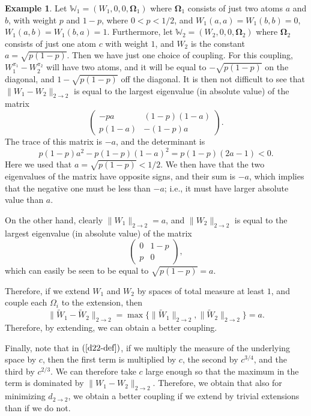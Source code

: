 \documentclass{amsart}
\numberwithin{equation}{section}
\numberwithin{figure}{section}
\theoremstyle{definition}
\newtheorem{example}[theorem]{Example}
\theoremstyle{remark}
\newcommand{\bOmega}{{\mathbf{\Omega}}}
\newcommand{\cW}{\mathbb{W}}
\newcommand{\wW}{\widetilde{W}}
\begin{document}
\begin{example}\label{ex1}
Let $\cW_1=(W_1,0,0,\bOmega_1)$ where $\bOmega_1$ consists of just two atoms
$a$ and $b$, with weight $p$ and $1-p$, where $0<p<1/2$, and
$W_1(a,a)=W_1(b,b)=0$, $W_1(a,b)=W_1(b,a)=1$. Furthermore, let
$\cW_2=(W_2,0,0,\bOmega_2)$ where $\bOmega_2$ consists of just one atom $c$
with weight $1$, and $W_2$ is the constant $a=\sqrt{p(1-p)}$. Then we have
just one choice of coupling. For this coupling, $W_1^{\pi_1}-W_2^{\pi_2}$
will have two atoms, and it will be equal to $-\sqrt{p(1-p)}$ on the
diagonal, and $1-\sqrt{p(1-p)}$ off the diagonal. It is then not difficult to
see that $\|W_1-W_2\|_{2 \rightarrow 2}$ is equal to the largest eigenvalue
(in absolute value) of the matrix
\[\begin{pmatrix}
-pa & (1-p)(1-a)\\
p(1-a) & -(1-p)a
\end{pmatrix}
.
\]
The trace of this matrix is $-a$, and the determinant is
\[
p(1-p)a^2-p(1-p)(1-a)^2=p(1-p)(2a-1)<0
.
\]
Here we used that $a=\sqrt{p(1-p)}<1/2$. We then have that the two
eigenvalues of the matrix have opposite signs, and their sum is $-a$, which
implies that the negative one must be less than $-a$; i.e., it must have
larger absolute value than $a$.

On the other hand, clearly $\|W_1\|_{2 \rightarrow 2}=a$, and $\|W_2\|_{2\to
2}$ is equal to the largest eigenvalue (in absolute value) of the matrix
\[\begin{pmatrix}
0 & 1-p\\
p & 0
\end{pmatrix}
,
\]
which can easily be seen to be equal to $\sqrt{p(1-p)}=a$.

Therefore, if we extend $W_1$ and $W_2$ by spaces of total measure at least
$1$, and couple each $\Omega_i$ to the extension, then
\[
\|\wW_1-\wW_2\|_{2 \rightarrow 2}=\max\{\|\wW_1\|_{2\to2},\|\wW_2\|_{2\to2}\}=a
.
\]
Therefore, by extending, we can obtain a better coupling.

Finally, note that in $(\ref{d22-def})$, if we multiply the measure of the
underlying space by $c$, then the first term is multiplied by $c$, the second
by $c^{3/4}$, and the third by $c^{2/3}$. We can therefore take $c$ large
enough so that the maximum in the term is dominated by $\|W_1-W_2\|_{2\to2}$.
Therefore, we obtain that also for minimizing $d_{2 \to 2}$, we obtain a
better coupling if we extend by trivial extensions than if we do not.
\end{example}
\end{document}
